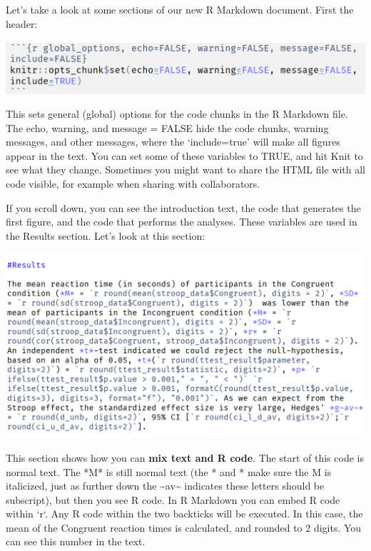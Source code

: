 \documentclass[
  oneside]{krantz}
\begin{document}
Let's take a look at some sections of our new R Markdown document. First the
header:

\begin{center}\includegraphics[width=1\linewidth]{images/5be3bc1c3f5a2ebf2d16d19430312057} \end{center}

This sets general (global) options for the code chunks in the R Markdown file. The echo,
warning, and message = FALSE hide the code chunks, warning messages, and other
messages, where the `include=true' will make all figures appear in the text. You
can set some of these variables to TRUE, and hit Knit to see what they change.
Sometimes you might want to share the HTML file with all code visible, for
example when sharing with collaborators.

If you scroll down, you can see the introduction text, the code that generates
the first figure, and the code that performs the analyses. These variables are
used in the Results section. Let's look at this section:

\begin{center}\includegraphics[width=1\linewidth]{images/aab442e8c104cb1444a88b7a3a987de5} \end{center}

This section shows how you can \textbf{mix text and R code}. The start of this code
is normal text. The *M* is still normal text (the * and * make sure the M is italicized, just as further down the \textasciitilde av\textasciitilde{} indicates these letters should be subscript), but then you see R code. In R Markdown you can embed R code within `r`.
Any R code within the two backticks will be executed. In this case, the mean
of the Congruent reaction times is calculated, and rounded to 2 digits. You can
see this number in the text.
\end{document}
